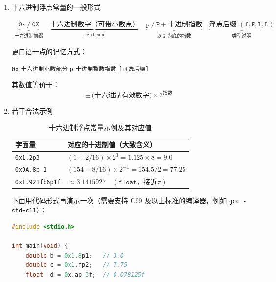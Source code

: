 \begin{enumerate}[label=(\arabic*), wide=0pt]
    \item 十六进制浮点常量的一般形式


\[
\begin{aligned}
  \underbrace{\mathtt{0x}\ \mbox{/}\ \mathtt{0X}}_{\mbox{十六进制前缀}}
  \quad
  \underbrace{\mbox{十六进制数字（可带小数点）}}_{\mbox{significand}}
  \quad
  \underbrace{\mathtt{p}\ \mbox{/}\ \mathtt{P} + \mbox{十进制指数}}_{\mbox{以 2 为底的指数}}
  \quad
  \underbrace{\mbox{浮点后缀 }(\mathtt{f},\mathtt{F},\mathtt{l},\mathtt{L})}_{\mbox{类型说明}}
\end{aligned}
  \]

更口语一点的记忆方式：  
\begin{center}
\verb|0x| \texttt{十六进制小数部分} \verb|p| \texttt{十进制整数指数} \texttt{[可选后缀]}
\end{center}

\noindent
其数值等价于：
\[
  \pm\,\mbox{(十六进制有效数字)} \times 2^{\mbox{指数}}
\]

\newpage

    \item 若干合法示例
    
\begin{table}[H]
\centering
\caption{十六进制浮点常量示例及其对应值}\label{tab:hex-float}
\begin{tabular}{ll}
\toprule
字面量 & 对应的十进制值（大致含义） \\
\midrule
\verb|0x1.2p3|       & $(1 + 2/16) \times 2^{3} = 1.125 \times 8 = 9.0$ \\
\verb|0x9A.8p-1|     & $(154 + 8/16) \times 2^{-1} = 154.5 / 2 = 77.25$ \\
\verb|0x1.921fb6p1f| & $\approx 3.1415927\quad(\texttt{float}，接近 \pi)$ \\
\bottomrule
\end{tabular}
\end{table}






下面用代码形式再演示一次（需要支持 C99 及以上标准的编译器，例如 \verb|gcc -std=c11|）：

\begin{lstlisting}[language=C,caption={十六进制浮点常量示例},label={code:hex-float}]
#include <stdio.h>

int main(void) {
    double b = 0x1.8p1;   // 3.0
    double c = 0x1.fp2;   // 7.75
    float  d = 0x.ap-3f;  // 0.078125f


\end{lstlisting}
\end{enumerate}
